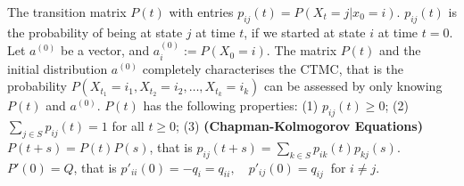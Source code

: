  The transition matrix $P(t)$ with entries 
$p_{ij}(t) = P(X_t = j | x_0 = i).$  
$p_{ij}(t)$ is the probability of being at state $j$ at time $t$, if we started at state $i$ at time $t=0$.
 Let $a^{(0)}$ be a vector, and $a^{(0)}_i := P(X_0 = i)$.
 The matrix $P(t)$ and the initial distribution $a^{(0)}$ completely characterises the CTMC, that is the probability 
$P(X_{t_1} = i_1, X_{t_2} = i_2, \ldots, X_{t_k} = i_k)$
can be assessed by only knowing $P(t)$ and $a^{(0)}$.
 $P(t)$ has the following properties:
(1) $p_{ij}(t) \ge 0$;
(2) $\sum_{j \in S}p_{ij}(t) = 1$ for all $t \ge 0$;
(3) \textbf{(Chapman-Kolmogorov Equations)} 
$P(t + s) = P(t)P(s)$, that is $p_{ij}(t+s) = \sum_{k \in S} p_{ik}(t) p_{kj}(s).$
 $P'(0) = Q$, that is 
$p'_{ii}(0) = -q_i = q_{ii}, \quad p'_{ij}(0) = q_{ij}\ $ for $i \ne j.$

